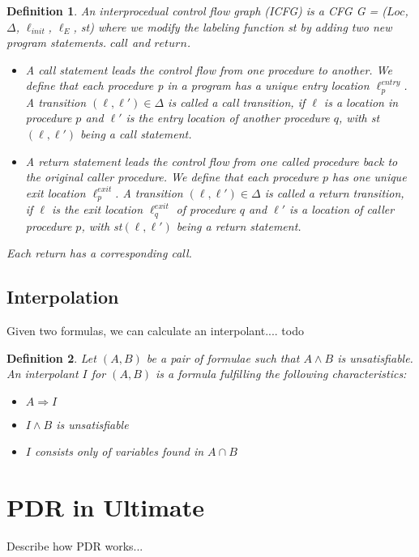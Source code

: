 \documentclass{article}
\newtheorem{mydef}{Definition}
\begin{document}
	\begin{mydef}
		An interprocedual control flow graph (ICFG) is a CFG G = ($Loc$, $\Delta$, $\ell_{init}$, $\ell_E$, st) where we modify the labeling function st by adding two new program statements.
		$call$ and $return$.
		\begin{itemize}
			\item A call statement leads the control flow from one procedure to another. We define that each procedure p in a program has a unique entry location $\ell^{entry}_p$.
			A transition $(\ell, \ell') \in \Delta$ is called a call transition, if $\ell$ is a location in procedure $p$ and $\ell'$ is the entry location of another procedure $q$, with st$(\ell, \ell')$ being a call statement.
			
			\item A return statement leads the control flow from one called procedure back to the original caller procedure. We define that each procedure $p$ has one unique exit location $\ell^{exit}_p$. A transition $(\ell, \ell') \in \Delta$ is called a return transition, if $\ell$ is the exit location $\ell_q^{exit}$ of procedure $q$ and $\ell'$ is a location of caller procedure $p$, with st$(\ell, \ell')$ being a return statement.
		\end{itemize}
	Each return has a corresponding call.
	\end{mydef}
	
	
	\pagebreak
		
	\subsection{Interpolation}
	Given two formulas, we can calculate an interpolant.... todo
	
	\begin{mydef}
		Let $(A, B)$ be a pair of formulae such that $A \land B$ is unsatisfiable. An interpolant $I$ for $(A, B)$ is a formula fulfilling the following characteristics:
		\begin{itemize}
			\item $A \Rightarrow I$
			\item $I \land B$ is unsatisfiable
			\item $I$ consists only of variables found in $A \cap B$
		\end{itemize}
	\end{mydef}

	\pagebreak
	
	\section{PDR in Ultimate}
	Describe how PDR works...
	
\end{document}
